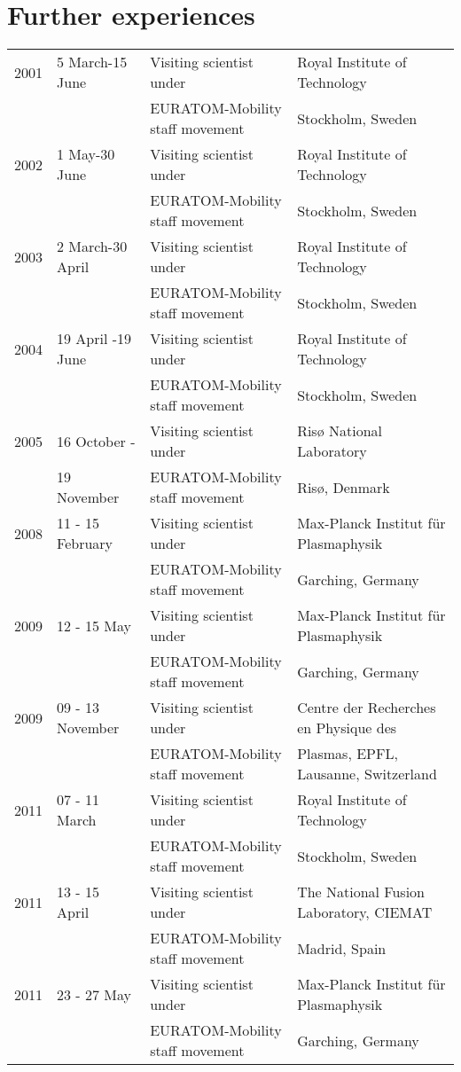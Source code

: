 \section{Further experiences}
\begin{longtable}{llll}
2001 & 5 March-15 June & Visiting scientist under& Royal Institute of
Technology\\
 & & EURATOM-Mobility
staff movement &  Stockholm, Sweden \\

2002 & 1 May-30 June & Visiting scientist under& Royal Institute of
Technology\\
 & & EURATOM-Mobility
staff movement &  Stockholm, Sweden \\
2003 & 2 March-30 April & Visiting scientist under& Royal Institute of
Technology\\
 & & EURATOM-Mobility
staff movement &  Stockholm, Sweden \\
2004 & 19 April -19 June & Visiting scientist under& Royal Institute of
Technology\\
 & & EURATOM-Mobility
staff movement &  Stockholm, Sweden \\
2005 & 16 October - & Visiting scientist under& Ris{\o}
National Laboratory\\
 & 19 November & EURATOM-Mobility
staff movement &  Ris{\o}, Denmark \\
2008 & 11 - 15 February & Visiting scientist under& Max-Planck
Institut f\"ur Plasmaphysik \\
 & & EURATOM-Mobility
staff movement &  Garching, Germany \\
2009 & 12 - 15 May & Visiting scientist under& Max-Planck
Institut f\"ur Plasmaphysik \\
 & & EURATOM-Mobility
staff movement &  Garching, Germany \\
2009 & 09 - 13 November & Visiting scientist under& Centre der
Recherches en Physique des \\
 & & EURATOM-Mobility
staff movement & Plasmas, EPFL, Lausanne, Switzerland \\
2011 & 07 - 11 March & Visiting scientist under& Royal Institute of
Technology\\
 & & EURATOM-Mobility
staff movement &  Stockholm, Sweden \\
2011 & 13 - 15 April & Visiting scientist under& The National Fusion
Laboratory, CIEMAT \\
 & & EURATOM-Mobility
staff movement &  Madrid, Spain \\
2011 & 23 - 27 May & Visiting scientist under& Max-Planck
Institut f\"ur Plasmaphysik \\
 & & EURATOM-Mobility
staff movement &  Garching, Germany \\
\end{longtable}
